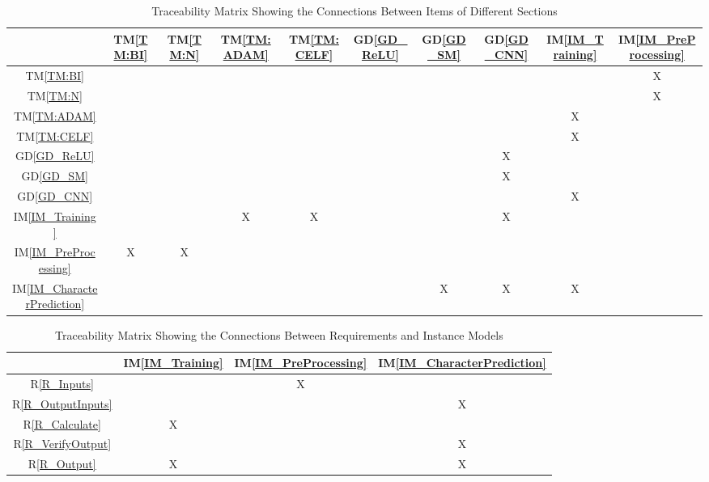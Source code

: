 \documentclass[12pt]{article}
\begin{document}
\begin{table}[h!]
\centering
\begin{tabular}{|c|c|c|c|c|c|c|c|c|c|}
  \hline
  & TM\ref{TM:BI} & TM\ref{TM:N} & TM\ref{TM:ADAM} & TM\ref{TM:CELF} & GD\ref{GD_ReLU} & GD\ref{GD_SM} & GD\ref{GD_CNN} & IM\ref{IM_Training} & IM\ref{IM_PreProcessing} \\ \hline
  TM\ref{TM:BI} &     &     &         &         &        &      &       &             & X                \\ \hline
  TM\ref{TM:N} &     &     &         &         &        &      &       &             & X                \\ \hline
  TM\ref{TM:ADAM} &     &     &         &         &        &      &       & X           &                  \\ \hline
  TM\ref{TM:CELF} &     &     &         &         &        &      &       & X           &                  \\ \hline
  GD\ref{GD_ReLU} &     &     &         &         &        &      & X     &             &                  \\ \hline
  GD\ref{GD_SM} &     &     &         &         &        &      & X     &             &                  \\ \hline
  GD\ref{GD_CNN} &     &     &         &         &        &      &       & X           &                  \\ \hline
  IM\ref{IM_Training} &     &     & X       & X       &        &      & X     &             &                  \\ \hline
  IM\ref{IM_PreProcessing} & X   & X   &         &         &        &      &       &             &                  \\ \hline
  IM\ref{IM_CharacterPrediction} &     &     &         &         &        & X    & X     & X           &                  \\ \hline
\end{tabular}
\caption{Traceability Matrix Showing the Connections Between Items of Different Sections}
\label{Table:trace}
\end{table}

\begin{table}[h!]
\centering
\begin{tabular}{|c|c|c|c|}
  \hline
     & IM\ref{IM_Training} & IM\ref{IM_PreProcessing} & IM\ref{IM_CharacterPrediction} \\ \hline
  R\ref{R_Inputs} &             & X                &                        \\ \hline
  R\ref{R_OutputInputs} &            &                  & X                      \\ \hline
  R\ref{R_Calculate} & X        &                  &                        \\ \hline
  R\ref{R_VerifyOutput} &        &                  & X                      \\ \hline
  R\ref{R_Output} & X      &                  & X                      \\ \hline
\end{tabular}
\caption{Traceability Matrix Showing the Connections Between Requirements and Instance Models}
\label{Table:R_trace}
\end{table}
\end{document}
